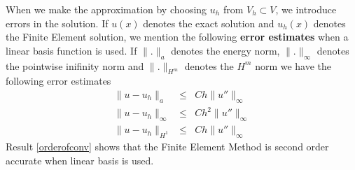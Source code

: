 When we make the approximation by choosing $u_h$ from $V_h \subset V$, we introduce errors in the solution. If $u(x)$ denotes the exact solution and $u_h(x)$ denotes the Finite Element solution, we mention the following \textbf{error estimates} when a linear basis function is used. If $\lVert . \rVert_a$ denotes the energy norm, $\lVert . \rVert_\infty$ denotes the pointwise inifinity norm and $\lVert . \rVert_{H^m}$ denotes the $H^m$ norm we have the following error estimates
\begin{eqnarray}
\lVert u - u_h \rVert_a &\le& Ch \lVert u'' \rVert_\infty\\
\lVert u - u_h \rVert_{\infty} &\le& Ch^2 \lVert u'' \rVert_\infty \label{orderofconv}\\ 
\lVert u - u_h \rVert_{H^1} &\le& Ch \lVert u'' \rVert_\infty
\end{eqnarray}
Result \ref{orderofconv} shows that the Finite Element Method is second order accurate when linear basis is used.

